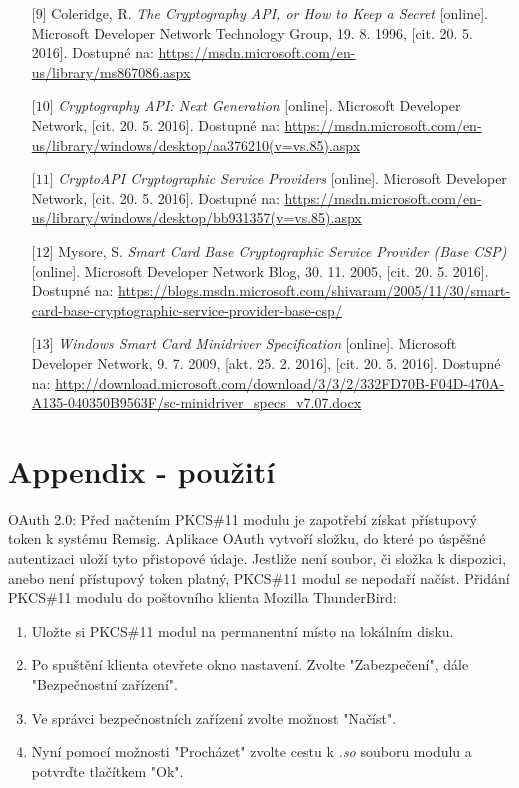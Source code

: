 \documentclass[]{fithesis3}
\begin{document}
{\begin{itemize}
	\item[$\mbox{[9]}$] Coleridge, R. \textit{The Cryptography API, or How to Keep a Secret} [online]. Microsoft Developer Network Technology Group, 19. 8. 1996, [cit. 20. 5. 2016]. Dostupné na: \url{https://msdn.microsoft.com/en-us/library/ms867086.aspx}

	\item[$\mbox{[10]}$] \textit{Cryptography API: Next Generation} [online]. Microsoft Developer Network, [cit. 20. 5. 2016]. Dostupné na: \url{https://msdn.microsoft.com/en-us/library/windows/desktop/aa376210(v=vs.85).aspx}

	\item[$\mbox{[11]}$] \textit{CryptoAPI Cryptographic Service Providers} [online]. Microsoft Developer Network, [cit. 20. 5. 2016]. Dostupné na: \url{https://msdn.microsoft.com/en-us/library/windows/desktop/bb931357(v=vs.85).aspx}

	\item[$\mbox{[12]}$] Mysore, S. \textit{Smart Card Base Cryptographic Service Provider (Base CSP)} [online]. Microsoft Developer Network Blog, 30. 11. 2005, [cit. 20. 5. 2016]. Dostupné na: \url{https://blogs.msdn.microsoft.com/shivaram/2005/11/30/smart-card-base-cryptographic-service-provider-base-csp/}

	\item[$\mbox{[13]}$] \textit{Windows Smart Card Minidriver Specification} [online]. Microsoft Developer Network, 9. 7. 2009, [akt. 25. 2. 2016], [cit. 20. 5. 2016]. Dostupné na: \url{http://download.microsoft.com/download/3/3/2/332FD70B-F04D-470A-A135-040350B9563F/sc-minidriver_specs_v7.07.docx}
\end{itemize}
}


\appendix %
\chapter{Appendix - použití}
	OAuth 2.0: \newline
	Před načtením PKCS\#11 modulu je zapotřebí získat přístupový token k systému Remsig. Aplikace OAuth vytvoří složku, do které po úspěšné autentizaci uloží tyto přistopové údaje. Jestliže není soubor, či složka k dispozici, anebo není přístupový token platný, PKCS\#11 modul se nepodaří načíst.
	\newline
	\newline
	Přidání PKCS\#11 modulu do poštovního klienta Mozilla ThunderBird:
	\begin{enumerate}
		\item Uložte si PKCS\#11 modul na permanentní místo na lokálním disku.
		\item Po spuštění klienta otevřete okno nastavení. Zvolte "Zabezpečení", dále 					"Bezpečnostní zařízení".
		\item Ve správci bezpečnostních zařízení zvolte možnost "Načíst".
		\item Nyní pomocí možnosti "Procházet" zvolte cestu k \textit{.so} souboru modulu a 				potvrďte tlačítkem "Ok".
	\end{enumerate}
	
\end{document}
